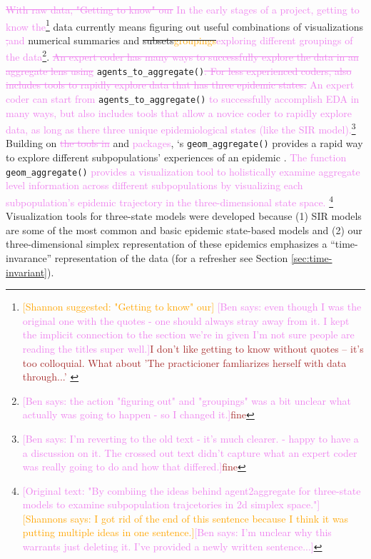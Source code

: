 \documentclass[
  shortnames]{jss}
\begin{document}
\textcolor{violet}{\sout{With raw data, "Getting to know" our} In the early stages of a project, getting to know the}\footnote{\textcolor{orange}{[Shannon suggested: "Getting to know" our]} \textcolor{violet}{[Ben says: even though I was the original one with the quotes - one should always stray away from it. I kept the implicit connection to the section we're in given I'm not sure people are reading the titles super well.]}\textcolor{brown}{I don't like getting to know without quotes -- it's too colloquial.  What about 'The practicioner famliarizes herself with data through...' }}
data currently means figuring out useful combinations of visualizations
\textcolor{violet}{\sout{,}and} numerical summaries and
\sout{\sout{subsets}\textcolor{orange}{groupings}}\textcolor{violet}{exploring different groupings of the data}\footnote{\textcolor{violet}{[Ben says: the action "figuring out" and "groupings" was a bit unclear what actually was going to happen - so I changed it.]}\textcolor{brown}{fine}}.
\textcolor{violet}{\sout{An expert coder has many ways to successfully explore the data in an aggregate lens using }}\texttt{agents\_to\_aggregate()}\textcolor{violet}{\sout{. For less experienced coders,  also includes tools to rapidly explore data that has three epidemic states.} An expert coder can start from }
\texttt{agents\_to\_aggregate()}
\textcolor{violet}{to successfully accomplish EDA in many ways, but  also includes tools that allow a novice coder to rapidly explore data, as long as there three unique epidemiological states (like the SIR model).}\footnote{\textcolor{violet}{[Ben says: I'm reverting to the old text - it's much clearer. - happy to have a a discussion on it. The crossed out text didn't capture what an expert coder was really going to do and how that differed.]}\textcolor{brown}{fine}}
Building on \textcolor{violet}{\sout{the tools in}}  and
 \textcolor{violet}{packages}, `s
\texttt{geom\_aggregate()} provides a rapid way to explore different
subpopulations' experiences of an epidemic
\citep{Wickham2016, Hamilton2018}.
\textcolor{violet}{The function }\texttt{geom\_aggregate()}
\textcolor{violet}{provides a visualization tool to holistically examine aggregate level information across different subpopulations by visualizing each subpopulation's epidemic trajectory in the three-dimensional state space.}
\footnote{\textcolor{violet}{[Original text: "By combiing the ideas behind agent2aggregate for three-state models to examine subpopulation trajcetories in 2d simplex space."]} \textcolor{orange}{[Shannons says: I got rid of the end of this sentence because I think it was putting multiple ideas in one sentence.]}\textcolor{violet}{[Ben says: I'm unclear why this warrants just deleting it. I've provided a newly written sentence...]}}
Visualization tools for three-state models were developed because (1)
SIR models are some of the most common and basic epidemic state-based
models and (2) our three-dimensional simplex representation of these
epidemics emphasizes a ``time-invarance'' representation of the data
(for a refresher see Section \ref{sec:time-invariant}).
\end{document}
